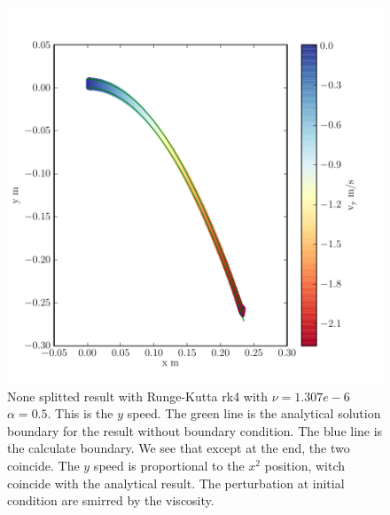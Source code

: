 \begin{figure}
	\includegraphics{topology/lateral_jet/plot_8__2_186.pdf}
	\caption{None splitted result with Runge-Kutta rk4 with $\nu=1.307e-6$ $\alpha=0.5$.
	This is the $y$ speed.
	The green line is the analytical solution boundary for the result without boundary condition.
	The blue line is the calculate boundary.
	We see that except at the end, the two coincide.
	The $y$ speed is proportional to the $x^2$ position, witch coincide with the analytical result.
	The perturbation at initial condition are smirred by the viscosity.}
	\label{topo:extrap:lateral:8_2}
\end{figure}

